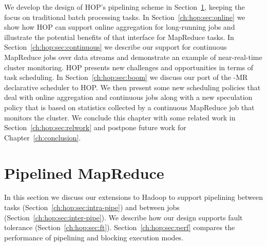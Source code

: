 We develop the design of HOP's pipelining scheme in Section~\ref{ch:hop:sec:pipelining}, keeping the
focus on traditional batch processing tasks.  In Section~\ref{ch:hop:sec:online} we
show how HOP can support online aggregation for long-running jobs and illustrate
the potential benefits of that interface for MapReduce tasks.  In
Section~\ref{ch:hop:sec:continuous} we describe our support for continuous MapReduce
jobs over data streams and demonstrate an example of near-real-time cluster
monitoring. HOP presents new challenges and opportunities in terms of task scheduling.
In Section~\ref{ch:hop:sec:boom} we discuss our port of the \BOOM-MR declarative scheduler to HOP. 
We then present some new scheduling policies that deal with online aggregation and continuous jobs along 
with a new speculation policy that is based on statistics collected by a continuous MapReduce job that monitors 
the cluster. We conclude this chapter with some related work in Section~\ref{ch:hop:sec:relwork} and 
postpone future work for Chapter~\ref{ch:conclusion}.

\section{Pipelined MapReduce}
\label{ch:hop:sec:pipelining}

In this section we discuss our extensions to Hadoop to support pipelining
between tasks (Section~\ref{ch:hop:sec:intra-pipe}) and between jobs
(Section~\ref{ch:hop:sec:inter-pipe}).  We describe how our design supports fault
tolerance (Section~\ref{ch:hop:sec:ft}). Section~\ref{ch:hop:sec:perf}
compares the performance of pipelining and blocking execution modes. 


